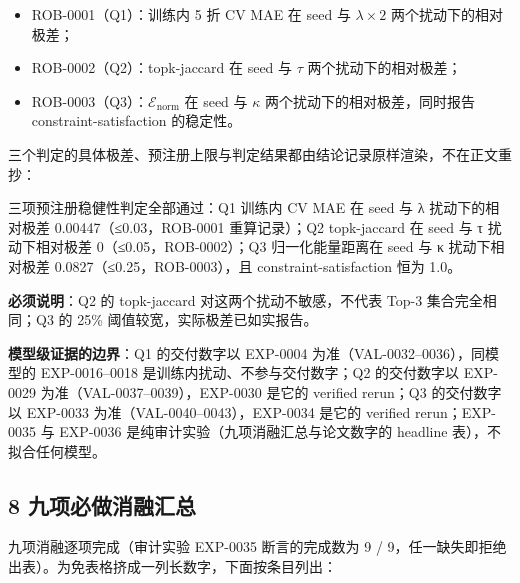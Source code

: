 \documentclass[
  11pt,
]{article}
\providecommand{\tightlist}{%
  \setlength{\itemsep}{0pt}\setlength{\parskip}{0pt}}
\begin{document}
\begin{itemize}
\tightlist
\item
  ROB-0001（Q1）：训练内 5 折 CV MAE 在 seed 与 \(\lambda\times2\)
  两个扰动下的相对极差；
\item
  ROB-0002（Q2）：topk-jaccard 在 seed 与 \(\tau\)
  两个扰动下的相对极差；
\item
  ROB-0003（Q3）：\(\mathcal E_{\mathrm{norm}}\) 在 seed 与 \(\kappa\)
  两个扰动下的相对极差，同时报告 constraint-satisfaction 的稳定性。
\end{itemize}

三个判定的具体极差、预注册上限与判定结果都由结论记录原样渲染，不在正文重抄：

三项预注册稳健性判定全部通过：Q1 训练内 CV MAE 在 seed 与 λ
扰动下的相对极差 0.00447（≤0.03，ROB-0001 重算记录）；Q2 topk-jaccard 在
seed 与 τ 扰动下相对极差 0（≤0.05，ROB-0002）；Q3 归一化能量距离在 seed
与 κ 扰动下相对极差 0.0827（≤0.25，ROB-0003），且
constraint-satisfaction 恒为 1.0。

\textbf{必须说明}：Q2 的 topk-jaccard 对这两个扰动不敏感，不代表 Top-3
集合完全相同；Q3 的 25\% 阈值较宽，实际极差已如实报告。

\textbf{模型级证据的边界}：Q1 的交付数字以 EXP-0004
为准（VAL-0032--0036），同模型的 EXP-0016--0018
是训练内扰动、不参与交付数字；Q2 的交付数字以 EXP-0029
为准（VAL-0037--0039），EXP-0030 是它的 verified rerun；Q3 的交付数字以
EXP-0033 为准（VAL-0040--0043），EXP-0034 是它的 verified
rerun；EXP-0035 与 EXP-0036 是纯审计实验（九项消融汇总与论文数字的
headline 表），不拟合任何模型。

\subsection{8
九项必做消融汇总}\label{ux4e5dux9879ux5fc5ux505aux6d88ux878dux6c47ux603b}

九项消融逐项完成（审计实验 EXP-0035 断言的完成数为 9 /
9，任一缺失即拒绝出表）。为免表格挤成一列长数字，下面按条目列出：
\end{document}
